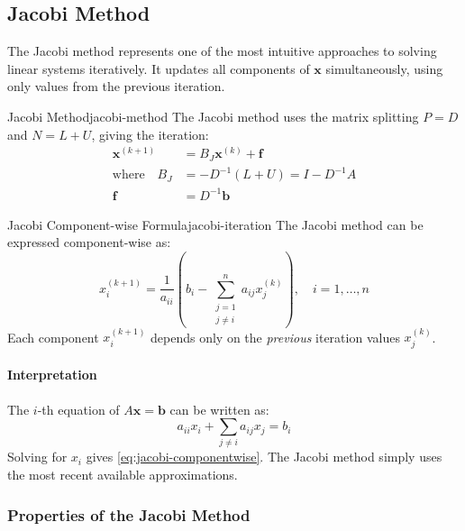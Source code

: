 \subsection{Jacobi Method}

The Jacobi method represents one of the most intuitive approaches to solving linear systems iteratively. It updates all components of $\mathbf{x}$ simultaneously, using only values from the previous iteration.

\begin{definition}{Jacobi Method}{jacobi-method}
    The Jacobi method uses the matrix splitting $P = D$ and $N = L + U$, giving the iteration:
    \begin{align}
        \mathbf{x}^{(k+1)} &= B_J \mathbf{x}^{(k)} + \mathbf{f} \\
        \text{where} \quad B_J &= -D^{-1}(L + U) = I - D^{-1}A \\
        \mathbf{f} &= D^{-1}\mathbf{b}
    \end{align}
\end{definition}

\begin{corollary}{Jacobi Component-wise Formula}{jacobi-iteration}
    The Jacobi method can be expressed component-wise as:
    \begin{equation}
        x_i^{(k+1)} = \frac{1}{a_{ii}}\left(b_i - \sum_{\substack{j=1 \\ j \neq i}}^n a_{ij} x_j^{(k)}\right), \quad i = 1, \ldots, n
        \label{eq:jacobi-componentwise}
    \end{equation}
    Each component $x_i^{(k+1)}$ depends only on the \emph{previous} iteration values $x_j^{(k)}$.
\end{corollary}

\paragraph{Interpretation}
The $i$-th equation of $A\mathbf{x} = \mathbf{b}$ can be written as:
\begin{equation}
    a_{ii}x_i + \sum_{j \neq i} a_{ij}x_j = b_i
\end{equation}
Solving for $x_i$ gives \eqref{eq:jacobi-componentwise}. The Jacobi method simply uses the most recent available approximations.

\subsubsection{Properties of the Jacobi Method}

